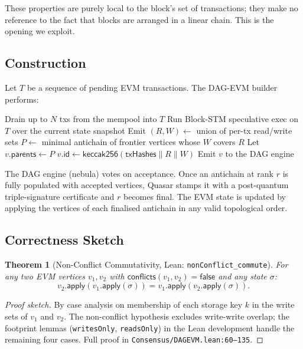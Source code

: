 \documentclass[11pt]{article}
\newtheorem{theorem}{Theorem}
\theoremstyle{definition}
\begin{document}
These properties are purely local to the block's set of transactions; they
make no reference to the fact that blocks are arranged in a linear chain.
This is the opening we exploit.

\subsection{Construction}

Let $T$ be a sequence of pending EVM transactions. The DAG-EVM builder
performs:

\begin{algorithm}[h]
\caption{BuildVertex (DAG-EVM)}
\begin{algorithmic}[1]
\State Drain up to $N$ txs from the mempool into $T$
\State Run Block-STM speculative exec on $T$ over the current state snapshot
\State Emit $(R, W) \gets$ union of per-tx read/write sets
\State $P \gets$ minimal antichain of frontier vertices whose $W$ covers $R$
\State Let $v.\mathsf{parents} \gets P$
\State $v.\mathsf{id} \gets \mathsf{keccak256}(\mathsf{txHashes} \parallel R \parallel W)$
\State Emit $v$ to the DAG engine
\end{algorithmic}
\end{algorithm}

The DAG engine (nebula) votes on acceptance. Once an antichain at rank $r$
is fully populated with accepted vertices, Quasar stamps it with a
post-quantum triple-signature certificate and $r$ becomes final. The EVM
state is updated by applying the vertices of each finalised antichain in
any valid topological order.

\subsection{Correctness Sketch}

\begin{theorem}[Non-Conflict Commutativity, Lean: \texttt{nonConflict\_commute}]
\label{thm:commute}
For any two EVM vertices $v_1, v_2$ with $\mathsf{conflicts}(v_1, v_2)
= \mathsf{false}$ and any state $\sigma$:
\[
v_2.\mathsf{apply}(v_1.\mathsf{apply}(\sigma)) = v_1.\mathsf{apply}(v_2.\mathsf{apply}(\sigma)).
\]
\end{theorem}

\begin{proof}[Proof sketch]
By case analysis on membership of each storage key $k$ in the write sets
of $v_1$ and $v_2$. The non-conflict hypothesis excludes write-write
overlap; the footprint lemmas (\texttt{writesOnly}, \texttt{readsOnly}) in
the Lean development handle the remaining four cases. Full proof in
\texttt{Consensus/DAGEVM.lean:60--135}.
\end{proof}
\end{document}
